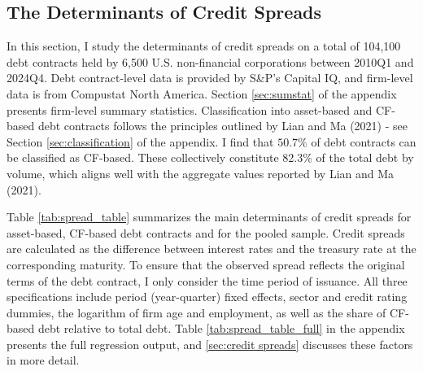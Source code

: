 \documentclass[12pt]{article}
\begin{document}
\subsection{The Determinants of Credit Spreads \label{sec:emp liqrisk}} 

In this section, I study the determinants of credit spreads on a total of 104,100 debt contracts held by 6,500 U.S. non-financial corporations between 2010Q1 and 2024Q4. Debt contract-level data is provided by S\&P's Capital IQ, and firm-level data is from Compustat North America. Section \ref{sec:sumstat} of the appendix presents firm-level summary statistics. Classification into asset-based and CF-based debt contracts follows the principles outlined by Lian and Ma (2021) - see Section \ref{sec:classification} of the appendix. I find that $50.7\%$ of debt contracts can be classified as CF-based. These collectively constitute 82.3\% of the total debt by volume, which aligns well with the aggregate values reported by Lian and Ma (2021).

Table \ref{tab:spread_table} summarizes the main determinants of credit spreads for asset-based, CF-based debt contracts and for the pooled sample. Credit spreads are calculated as the difference between interest rates and the treasury rate at the corresponding maturity. To ensure that the observed spread reflects the original terms of the debt contract, I only consider the time period of issuance. All three specifications include period (year-quarter) fixed effects, sector and credit rating dummies, the logarithm of firm age and employment, as well as the share of CF-based debt relative to total debt. Table \ref{tab:spread_table_full} in the appendix presents the full regression output, and \ref{sec:credit spreads} discusses these factors in more detail.
\end{document}
